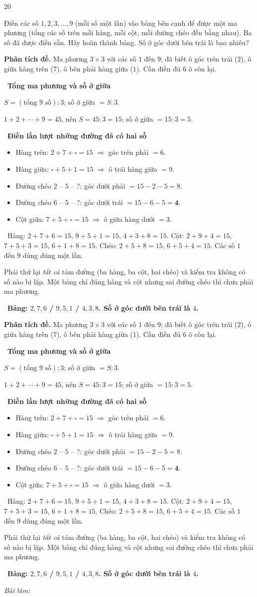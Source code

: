 \documentclass[11pt]{article}
\newif\ifsol \soltrue
\providecommand{\AnsWord}{Đáp số}
\newenvironment{probbox}[2]{\begin{probboxT}{#1}{#2}}{\end{probboxT}}
\newcommand{\StuProb}[2]{\begin{probboxS}{#1}{#2}\StuProbBody\end{probboxS}}
\newcommand{\ans}[1]{\par\smallskip{\bfseries\color{tmGreen!88!black}\AnsWord:}\ {\bfseries\color{AnsRed}#1}\par}
\newcommand{\probsol}[1]{%
  \begin{lrbox}{\solmeasure}\begin{minipage}{\dimexpr\linewidth-24pt\relax}#1\end{minipage}\end{lrbox}%
  \ifsol
    \begin{solbox}#1\end{solbox}%
  \else
    \setlength{\solht}{\dimexpr\ht\solmeasure+\dp\solmeasure+0.85cm\relax}%
    \ifdim\solht<1.35cm\setlength{\solht}{1.35cm}\fi
    \ifdim\solht>\StudentMaxWork\setlength{\solht}{\StudentMaxWork}\fi
    \par\noindent\begin{minipage}{\linewidth}%
    \expandafter\StuProb\StuProbArgs
    \begin{tcolorbox}[colback=white,colframe=Line,boxrule=0.8pt,arc=5pt,
      left=8pt,right=8pt,top=4pt,bottom=4pt,height=\solht]{\footnotesize\color{Slate}\itshape\WorkWord}\end{tcolorbox}%
    \end{minipage}\par\medskip
  \fi}
\newlength{\StudentMaxWork}\setlength{\StudentMaxWork}{4.5cm}
\newcommand{\step}[2]{\par\smallskip\noindent{\bfseries\color{tmBlue!85!black}\StepWord~#1.}\ {\bfseries #2}\par\nopagebreak}
\newcommand{\verify}[1]{\par\smallskip\noindent{\bfseries\color{tmGreen!80!black}\faCheckCircle\ \CheckWord}\ #1\par}
\def\WorkWord{Bài làm:}
\def\AnsWord{Đáp số}
\def\StepWord{Bước}
\def\CheckWord{Thử lại:}
\begin{document}
\begin{probbox}{20}{\relax}
\begin{minipage}[t]{0.63\linewidth}
Điền các số $1, 2, 3, \ldots, 9$ (mỗi số một lần) vào bảng bên cạnh để được một ma phương (tổng các số trên mỗi hàng, mỗi cột, mỗi đường
chéo đều bằng nhau). Ba số đã được điền sẵn. Hãy hoàn thành bảng. Số ở góc dưới bên trái là bao nhiêu?
\end{minipage}\hfill
\begin{minipage}[t]{0.33\linewidth}\vspace{-4pt}\centering
{}
\end{minipage}
\end{probbox}
\probsol{
\textbf{Phân tích đề.} Ma phương $3\times 3$ với các số $1$ đến $9$; đã biết ô góc trên trái ($2$), ô giữa hàng trên ($7$), ô bên phải
hàng giữa ($1$). Cần điền đủ $6$ ô còn lại.
\step{1}{Tổng ma phương và số ở giữa}
\begin{recallbox}$S = (\text{tổng } 9 \text{ số}) : 3$; số ở giữa $= S : 3$.\end{recallbox}
$1 + 2 + \cdots + 9 = 45$, nên $S = 45 : 3 = 15$; số ở giữa $= 15 : 3 = 5$.
\step{2}{Điền lần lượt những đường đã có hai số}
\begin{itemize}[leftmargin=1.4em,itemsep=1pt,topsep=1pt]
\item Hàng trên: $2 + 7 + \square = 15$ $\Rightarrow$ góc trên phải $= 6$.
\item Hàng giữa: $\square + 5 + 1 = 15$ $\Rightarrow$ ô trái hàng giữa $= 9$.
\item Đường chéo $2$ -- $5$ -- ?: góc dưới phải $= 15 - 2 - 5 = 8$.
\item Đường chéo $6$ -- $5$ -- ?: góc dưới trái $= 15 - 6 - 5 = \mathbf{4}$.
\item Cột giữa: $7 + 5 + \square = 15$ $\Rightarrow$ ô giữa hàng dưới $= 3$.
\end{itemize}
\begin{center}\lgaMagic{$2$}{$7$}{\textcolor{tmGreen!60!black}{$6$}}{\textcolor{tmGreen!60!black}{$9$}}{\textcolor{tmGreen!60!black}{$5$}}{$1$}{\textcolor{AnsRed}{$\mathbf{4}$}}{\textcolor{tmGreen!60!black}{$3$}}{\textcolor{tmGreen!60!black}{$8$}}\end{center}
\verify{Hàng: $2 + 7 + 6 = 15$, $9 + 5 + 1 = 15$, $4 + 3 + 8 = 15$. Cột: $2 + 9 + 4 = 15$, $7 + 5 + 3 = 15$, $6 + 1 + 8 = 15$.
Chéo: $2 + 5 + 8 = 15$, $6 + 5 + 4 = 15$. Các số $1$ đến $9$ dùng đúng một lần.}
\begin{warnbox}Phải thử lại \emph{tất cả} tám đường (ba hàng, ba cột, hai chéo) và kiểm tra không có số nào bị lặp. Một bảng chỉ đúng
hàng và cột nhưng sai đường chéo thì chưa phải ma phương.\end{warnbox}
\ans{Bảng: $2, 7, 6$ / $9, 5, 1$ / $4, 3, 8$. Số ở góc dưới bên trái là $4$.}
}
\end{document}
